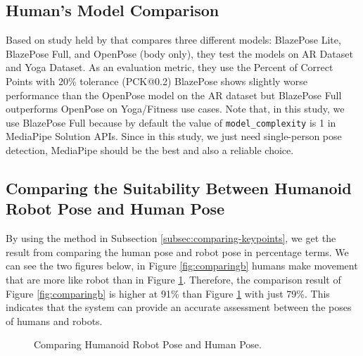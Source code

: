 \subsection{Human's Model Comparison}
\label{subsec:humanmodelcomparison}

Based on study held by \citet{bazarevsky2020} that compares three different models: BlazePose Lite, BlazePose Full, and OpenPose (body only), they test the models on AR Dataset and Yoga Dataset. As an evaluation metric, they use the Percent of Correct Points with 20\% tolerance (PCK@0.2)
BlazePose shows slightly worse performance than the OpenPose model on the AR dataset but BlazePose Full outperforms OpenPose on Yoga/Fitness use cases.
Note that, in this study, we use BlazePose Full because by default the value of \verb|model_complexity| is 1 in MediaPipe Solution APIs.
Since in this study, we just need single-person pose detection, MediaPipe should be the best and also a reliable choice.

\subsection{Comparing the Suitability Between Humanoid Robot Pose and Human Pose}
\label{subsec:comparingsuitability}

By using the method in Subsection \ref{subsec:comparing-keypoints}, we get the result from comparing the human pose and robot pose in percentage terms.
We can see the two figures below, in Figure \ref{fig:comparingb} humans make movement that are more like robot than in Figure \ref{fig:comparinga}.
Therefore, the comparison result of Figure \ref{fig:comparingb} is higher at 91\% than Figure \ref{fig:comparinga} with just 79\%.
This indicates that the system can provide an accurate assessment between the poses of humans and robots.

\begin{figure}
\centering
{}
\hfil
{}
\caption{Comparing Humanoid Robot Pose and Human Pose.}
\label{fig:comparinga}
\end{figure}

